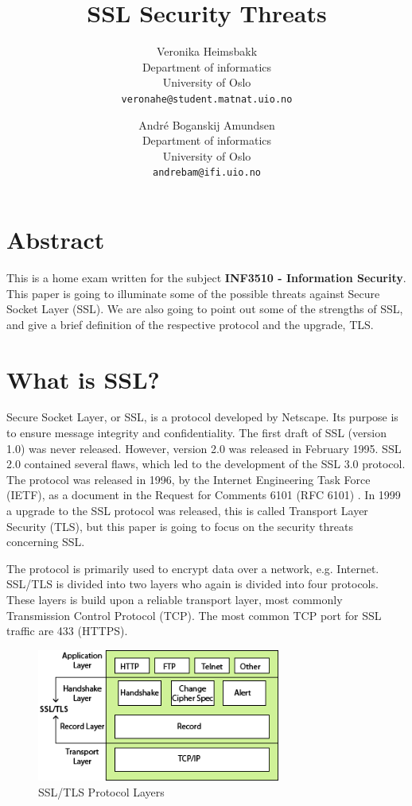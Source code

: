 \documentclass[11pt,a4paper, twocolumn]{article}
\title{SSL Security Threats}
\author{Veronika Heimsbakk\\ Department of informatics\\ University of Oslo\\ \texttt{veronahe@student.matnat.uio.no}
\and 
André Boganskij Amundsen\\ Department of informatics\\ University of Oslo\\ \texttt{andrebam@ifi.uio.no}}
\begin{document}
\maketitle{}


\section{Abstract}
This is a home exam written for the subject \textbf{INF3510 - Information Security}. This paper is going to illuminate some of the possible threats against Secure Socket Layer (SSL). We are also going to point out some of the strengths of SSL, and give a brief definition of the respective protocol and the upgrade, TLS.

\section{What is SSL?}
Secure Socket Layer, or SSL, is a protocol developed by Netscape. Its purpose is to ensure message integrity and confidentiality. The first draft of SSL (version 1.0) was never released. However, version 2.0 was released in February 1995. SSL 2.0 contained several flaws, which led to the development of the SSL 3.0 protocol. The protocol was released in 1996, by the Internet Engineering Task Force (IETF), as a document in the Request for Comments 6101 (RFC 6101) \cite{RFC 6101}. In 1999 a upgrade to the SSL protocol was released, this is called Transport Layer Security (TLS), but this paper is going to focus on the security threats concerning SSL.

The protocol is primarily used to encrypt data over a network, e.g. Internet.
SSL/TLS is divided into two layers who again is divided into four protocols. These layers is build upon a reliable transport layer, most commonly Transmission Control Protocol (TCP).
The most common TCP port for SSL traffic are 433 (HTTPS).

\begin{figure}
\centering
\includegraphics[width=8cm]{SSL-01.png}
\caption{SSL/TLS Protocol Layers}
\label{SSL}
\end{figure}
\end{document}
